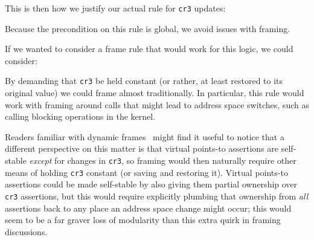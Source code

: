 This is then how we justify our actual rule for \lstinline|cr3| updates:
\begin{mathpar}
\end{mathpar}
Because the precondition on this rule is global, we avoid issues with framing.

If we wanted to consider a frame rule that would work for this logic, we could consider:
\begin{mathpar}
\end{mathpar}
By demanding that \lstinline|cr3| be held constant (or rather, at least restored to its original value) we could frame almost traditionally. In particular, this rule would work with framing around calls that might lead to address space switches, such as calling blocking operations in the kernel.

Readers familiar with dynamic frames~\cite{parkinson2011relationship} might find it useful to notice that a different perspective on this matter is that virtual points-to assertions are self-stable \emph{except} for changes in \lstinline|cr3|, so framing would then naturally require other means of holding \lstinline|cr3| constant (or saving and restoring it).
Virtual points-to assertions could be made self-stable by also giving them partial ownership over \lstinline|cr3| assertions, but this would require explicitly plumbing that ownership from \emph{all} assertions back to any place an address space change might occur; this would seem to be a far graver loss of modularity than this extra quirk in framing discussions.
